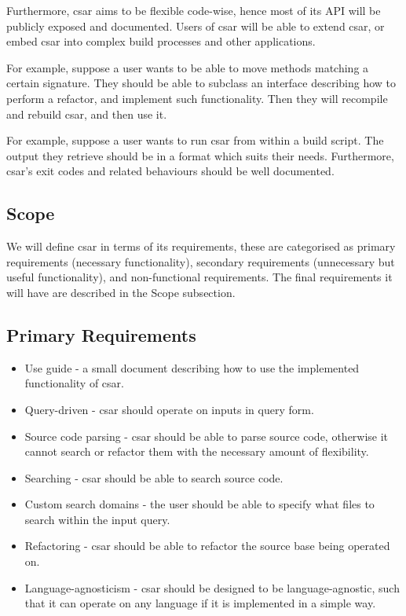 \documentclass[12pt, letterpaper]{article}
\begin{document}
Furthermore, csar aims to be flexible code-wise, hence most of its API will be publicly exposed and documented.
Users of csar will be able to extend csar, or embed csar into complex build processes and other applications.

For example, suppose a user wants to be able to move methods matching a certain signature.
They should be able to subclass an interface describing how to perform a refactor, and implement such functionality.
Then they will recompile and rebuild csar, and then use it.

For example, suppose a user wants to run csar from within a build script.
The output they retrieve should be in a format which suits their needs.
Furthermore, csar's exit codes and related behaviours should be well documented.

\subsection{Scope}
We will define csar in terms of its requirements, these are categorised as primary requirements (necessary functionality), secondary requirements (unnecessary but useful functionality), and non-functional requirements.
The final requirements it will have are described in the Scope subsection.

\subsection{Primary Requirements}
\begin{itemize}
  \item Use guide - a small document describing how to use the implemented functionality of csar.
  \item Query-driven - csar should operate on inputs in query form.
  \item Source code parsing - csar should be able to parse source code, otherwise it cannot search or refactor them with the necessary amount of flexibility.
  \item Searching - csar should be able to search source code.
  \item Custom search domains - the user should be able to specify what files to search within the input query.
  \item Refactoring - csar should be able to refactor the source base being operated on.
  \item Language-agnosticism - csar should be designed to be language-agnostic, such that it can operate on any language if it is implemented in a simple way.
\end{itemize}
\end{document}
